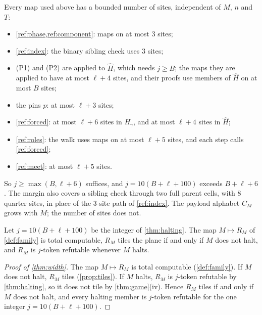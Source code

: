 Every map used above has a bounded number of sites, independent of $M$, $n$ and $T$:
\begin{itemize}
\item \cref{ref:phase,ref:component}: maps on at most $3$ sites;
\item \cref{ref:index}: the binary sibling check uses $3$ sites;
\item (P1) and (P2) are applied to $\widehat H$, which needs $j\ge B$; the maps they are applied to have at most $\ell+4$ sites, and their proofs use members of $\widehat H$ on at most $B$ sites;
\item the pins $p$: at most $\ell+3$ sites;
\item \cref{ref:forced}: at most $\ell+6$ sites in $H_\gamma$, and at most $\ell+4$ sites in $\widehat H$;
\item \cref{ref:roles}: the walk uses maps on at most $\ell+5$ sites, and each step calls \cref{ref:forced};
\item \cref{ref:meet}: at most $\ell+5$ sites.
\end{itemize}
So $j\ge\max(B,\ell+6)$ suffices, and $j=10(B+\ell+100)$ exceeds $B+\ell+6$. The margin also covers a sibling check through two full parent cells, with $8$ quarter sites, in place of the $3$-site path of \cref{ref:index}. The payload alphabet $C_M$ grows with $M$; the number of sites does not.

\begin{theorem}[Theorem C]\label{thm:width}
Let $j=10(B+\ell+100)$ be the integer of \cref{thm:halting}. The map $M\mapsto R_M$ of \cref{def:family} is total computable, $R_M$ tiles the plane if and only if $M$ does not halt, and $R_M$ is $j$-token refutable whenever $M$ halts.
\end{theorem}

\begin{proof}[Proof of \cref{thm:width}]
The map $M\mapsto R_M$ is total computable (\cref{def:family}). If $M$ does not halt, $R_M$ tiles (\cref{prop:tiles}). If $M$ halts, $R_M$ is $j$-token refutable by \cref{thm:halting}, so it does not tile by \cref{thm:game}(iv). Hence $R_M$ tiles if and only if $M$ does not halt, and every halting member is $j$-token refutable for the one integer $j=10(B+\ell+100)$.
\end{proof}


